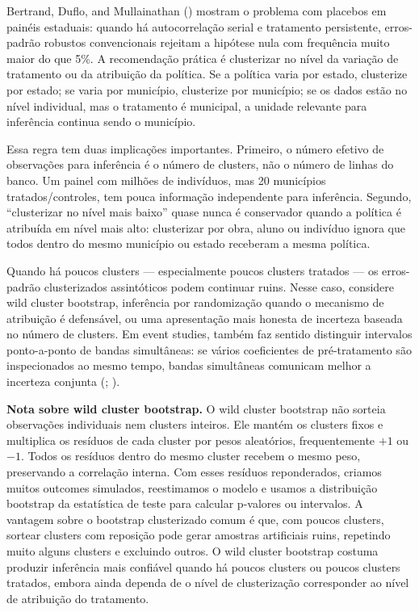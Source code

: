 \documentclass[
]{article}
\begin{document}
Bertrand, Duflo, and Mullainathan () mostram o problema com placebos em painéis estaduais: quando há autocorrelação serial e tratamento persistente, erros-padrão robustos convencionais rejeitam a hipótese nula com frequência muito maior do que 5\%. A recomendação prática é clusterizar no nível da variação de tratamento ou da atribuição da política. Se a política varia por estado, clusterize por estado; se varia por município, clusterize por município; se os dados estão no nível individual, mas o tratamento é municipal, a unidade relevante para inferência continua sendo o município.

Essa regra tem duas implicações importantes. Primeiro, o número efetivo de observações para inferência é o número de clusters, não o número de linhas do banco. Um painel com milhões de indivíduos, mas 20 municípios tratados/controles, tem pouca informação independente para inferência. Segundo, ``clusterizar no nível mais baixo'' quase nunca é conservador quando a política é atribuída em nível mais alto: clusterizar por obra, aluno ou indivíduo ignora que todos dentro do mesmo município ou estado receberam a mesma política.

Quando há poucos clusters --- especialmente poucos clusters tratados --- os erros-padrão clusterizados assintóticos podem continuar ruins. Nesse caso, considere wild cluster bootstrap, inferência por randomização quando o mecanismo de atribuição é defensável, ou uma apresentação mais honesta de incerteza baseada no número de clusters. Em event studies, também faz sentido distinguir intervalos ponto-a-ponto de bandas simultâneas: se vários coeficientes de pré-tratamento são inspecionados ao mesmo tempo, bandas simultâneas comunicam melhor a incerteza conjunta (; ).

\textbf{Nota sobre wild cluster bootstrap.} O wild cluster bootstrap não sorteia observações individuais nem clusters inteiros. Ele mantém os clusters fixos e multiplica os resíduos de cada cluster por pesos aleatórios, frequentemente \(+1\) ou \(-1\). Todos os resíduos dentro do mesmo cluster recebem o mesmo peso, preservando a correlação interna. Com esses resíduos reponderados, criamos muitos outcomes simulados, reestimamos o modelo e usamos a distribuição bootstrap da estatística de teste para calcular p-valores ou intervalos. A vantagem sobre o bootstrap clusterizado comum é que, com poucos clusters, sortear clusters com reposição pode gerar amostras artificiais ruins, repetindo muito alguns clusters e excluindo outros. O wild cluster bootstrap costuma produzir inferência mais confiável quando há poucos clusters ou poucos clusters tratados, embora ainda dependa de o nível de clusterização corresponder ao nível de atribuição do tratamento.
\end{document}
